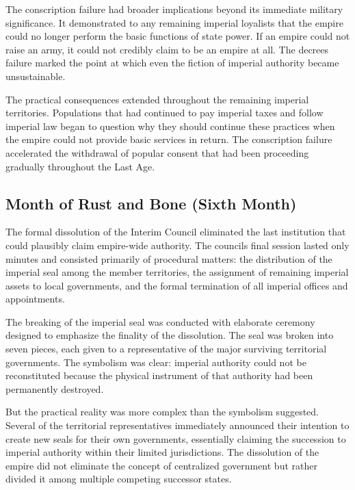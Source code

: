 The conscription failure had broader implications beyond its immediate
military significance. It demonstrated to any remaining imperial
loyalists that the empire could no longer perform the basic functions of
state power. If an empire could not raise an army, it could not credibly
claim to be an empire at all. The decree\textquotesingle s failure
marked the point at which even the fiction of imperial authority became
unsustainable.

The practical consequences extended throughout the remaining imperial
territories. Populations that had continued to pay imperial taxes and
follow imperial law began to question why they should continue these
practices when the empire could not provide basic services in return.
The conscription failure accelerated the withdrawal of popular consent
that had been proceeding gradually throughout the Last Age.

\subsection{Month of Rust and Bone (Sixth
Month)}\label{month-of-rust-and-bone-sixth-month}

The formal dissolution of the Interim Council eliminated the last
institution that could plausibly claim empire-wide authority. The
council\textquotesingle s final session lasted only minutes and
consisted primarily of procedural matters: the distribution of the
imperial seal among the member territories, the assignment of remaining
imperial assets to local governments, and the formal termination of all
imperial offices and appointments.

The breaking of the imperial seal was conducted with elaborate ceremony
designed to emphasize the finality of the dissolution. The seal was
broken into seven pieces, each given to a representative of the major
surviving territorial governments. The symbolism was clear: imperial
authority could not be reconstituted because the physical instrument of
that authority had been permanently destroyed.

But the practical reality was more complex than the symbolism suggested.
Several of the territorial representatives immediately announced their
intention to create new seals for their own governments, essentially
claiming the succession to imperial authority within their limited
jurisdictions. The dissolution of the empire did not eliminate the
concept of centralized government but rather divided it among multiple
competing successor states.

